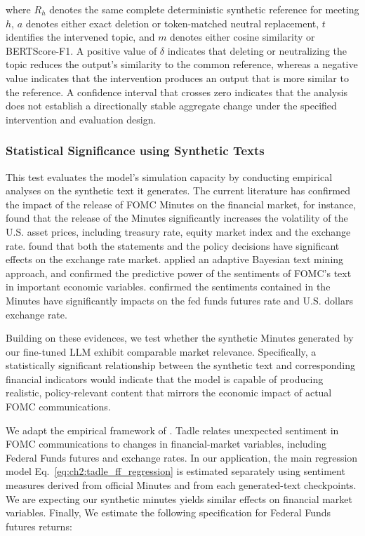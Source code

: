 where \(R_h\) denotes the same complete deterministic synthetic reference for meeting \(h\), \(a\) denotes either exact deletion or token-matched neutral replacement, \(t\) identifies the intervened topic, and \(m\) denotes either cosine similarity or BERTScore-F1. A positive value of \(\delta\) indicates that deleting or neutralizing the topic reduces the output’s similarity to the common reference, whereas a negative value indicates that the intervention produces an output that is more similar to the reference. A confidence interval that crosses zero indicates that the analysis does not establish a directionally stable aggregate change under the specified intervention and evaluation design.






\subsubsection*{Statistical Significance using Synthetic Texts}


This test evaluates the model’s simulation capacity by conducting empirical analyses on the synthetic text it generates. The current literature has confirmed the impact of the release of FOMC Minutes on the financial market, for instance, \cite{rosa2013financial} found that the release of the Minutes significantly increases the volatility of the U.S. asset prices, including treasury rate, equity market index and the exchange rate. \cite{rosa2011high} found that both the statements and the policy decisions have significant effects on the exchange rate market. \cite{huang2021economic} applied an adaptive Bayesian text mining approach, and confirmed the predictive power of the sentiments of FOMC's text in important economic variables. \cite{tadle2022fomc} confirmed the sentiments contained in the Minutes have significantly impacts on the fed funds futures rate and U.S. dollars exchange rate.


Building on these evidences, we test whether the synthetic Minutes generated by our fine-tuned LLM exhibit comparable market relevance. Specifically, a statistically significant relationship between the synthetic text and corresponding financial indicators would indicate that the model is capable of producing realistic, policy-relevant content that mirrors the economic impact of actual FOMC communications.


We adapt the empirical framework of \citet{tadle2022fomc}. Tadle relates unexpected sentiment in FOMC communications to changes in financial-market variables, including Federal Funds futures and exchange rates. In our application, the main regression model Eq.~\ref{eq:ch2:tadle_ff_regression} is estimated separately using sentiment measures derived from official Minutes and from each generated-text checkpoints. We are expecting our synthetic minutes yields similar effects on financial market variables. Finally, We estimate the following specification for Federal Funds futures returns:


